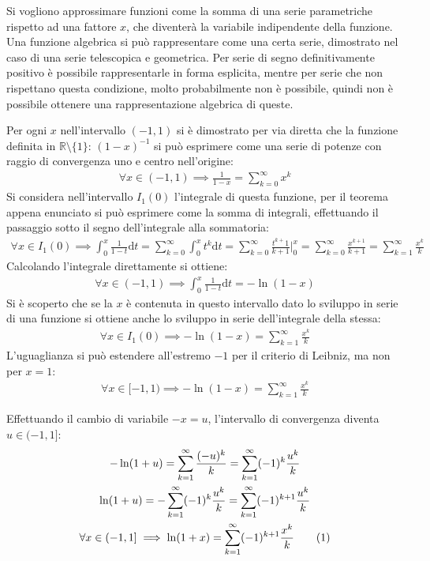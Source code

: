 \documentclass{article}
\numberwithin{equation}{subsection}
\newcommand{\tageq}{\tag{\stepcounter{equation}\theequation}}
\begin{document}
Si vogliono approssimare funzioni come la somma di una serie parametriche rispetto ad una fattore $x$, che diventerà la variabile indipendente della funzione. Una funzione algebrica si può rappresentare come una certa serie, dimostrato nel caso di una serie telescopica e geometrica. Per serie di segno definitivamente positivo è possibile rappresentarle in forma esplicita, mentre per serie che non rispettano questa condizione, molto probabilmente non è possibile, quindi non è possibile ottenere una rappresentazione algebrica di queste. 

Per ogni $x$ nell'intervallo $(-1,1)$ si è dimostrato per via diretta che la funzione definita in $\mathbb{R}\setminus\{1\}$: $(1-x)^{-1}$ si può esprimere come una serie di potenze con raggio di convergenza uno e centro nell'origine:
\begin{gather}\label{eq:1}
    \forall x\in(-1,1)\implies\displaystyle\frac{1}{1-x}=\sum_{k=0}^\infty x^k
\end{gather}
Si considera nell'intervallo $I_1(0)$ l'integrale di questa funzione, per il teorema appena enunciato si può esprimere come la somma di integrali, effettuando il passaggio sotto il segno dell'integrale alla sommatoria: 
\begin{gather*}
    \forall x \in I_1(0)\implies\displaystyle\int_{0}^x\frac{1}{1-t}\mathrm{d}t=
    \sum_{k=0}^\infty\int_{0}^x t^k\mathrm{d}t=
    \sum_{k=0}^\infty\frac{t^{k+}1}{k+1}\bigg|_{0}^x=
    \sum_{k=0}^\infty\frac{x^{k+1}}{k+1}=\sum_{k=1}^\infty\frac{x^k}{k}
\end{gather*}
Calcolando l'integrale direttamente si ottiene: 
\begin{gather*}
    \forall x\in(-1,1)\implies\displaystyle\int_0^x\frac{1}{1-t}\mathrm{d}t=-\ln(1-x)
\end{gather*}
Si è scoperto che se la $x$ è contenuta in questo intervallo dato lo sviluppo in serie di una funzione si ottiene anche lo sviluppo in serie dell'integrale della stessa:
\begin{gather*}
    \forall x\in I_1(0)\implies -\ln(1-x)=\displaystyle\sum_{k=1}^\infty\frac{x^k}{k}
\end{gather*}
L'uguaglianza si può estendere all'estremo $-1$ per il criterio di Leibniz, ma non per $x=1$:
\begin{gather}
    \forall x\in [-1,1)\implies -\ln(1-x)=\displaystyle\sum_{k=1}^\infty\frac{x^k}{k}
\end{gather}

Effettuando il cambio di variabile $-x=u$, l'intervallo di convergenza diventa $u\in(-1, 1]$:
\begin{gather*}
    -\ln(1+u)=\displaystyle\sum_{k=1}^\infty\frac{(-u)^k}{k}=
    \displaystyle\sum_{k=1}^\infty(-1)^k\frac{u^k}{k}\\
    \ln(1+u)=-\displaystyle\sum_{k=1}^\infty(-1)^k\frac{u^k}{k}=
    \displaystyle\sum_{k=1}^\infty(-1)^{k+1}\frac{u^k}{k}\\
    \forall x\in(-1,1]\implies\ln(1+x)=\displaystyle\sum_{k=1}^\infty(-1)^{k+1}\frac{x^k}{k}\tageq
\end{gather*}
\end{document}
